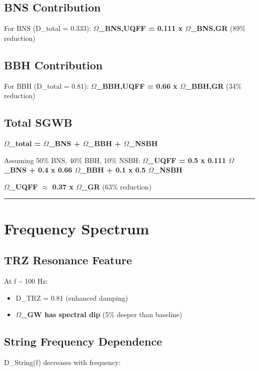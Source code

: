 \documentclass[12pt,a4paper]{article}
\begin{document}
\subsection{BNS Contribution}

For BNS (D\_total = 0.333): \textbf{$\Omega$\_BNS,UQFF = 0.111 x $\Omega$\_BNS,GR} (89\% reduction)

\subsection{BBH Contribution}

For BBH (D\_total = 0.81): \textbf{$\Omega$\_BBH,UQFF = 0.66 x $\Omega$\_BBH,GR} (34\% reduction)

\subsection{Total SGWB}

\textbf{$\Omega$\_total = $\Omega$\_BNS + $\Omega$\_BBH + $\Omega$\_NSBH}

Assuming 50\% BNS, 40\% BBH, 10\% NSBH: \textbf{$\Omega$\_UQFF = 0.5 x 0.111 $\Omega$\_BNS + 0.4 x 0.66 $\Omega$\_BBH + 0.1 x 0.5 $\Omega$\_NSBH}

\textbf{$\Omega$\_UQFF $\approx$ 0.37 x $\Omega$\_GR} (63\% reduction)

\medskip\hrule\medskip

\section{Frequency Spectrum}

\subsection{TRZ Resonance Feature}

At f \textasciitilde{} 100 Hz:

\begin{itemize}
  \item D\_TRZ = 0.81 (enhanced damping)
  \item \textbf{$\Omega$\_GW has spectral dip} (5\% deeper than baseline)
\end{itemize}

\subsection{String Frequency Dependence}

D\_String(f) decreases with frequency:
\end{document}
